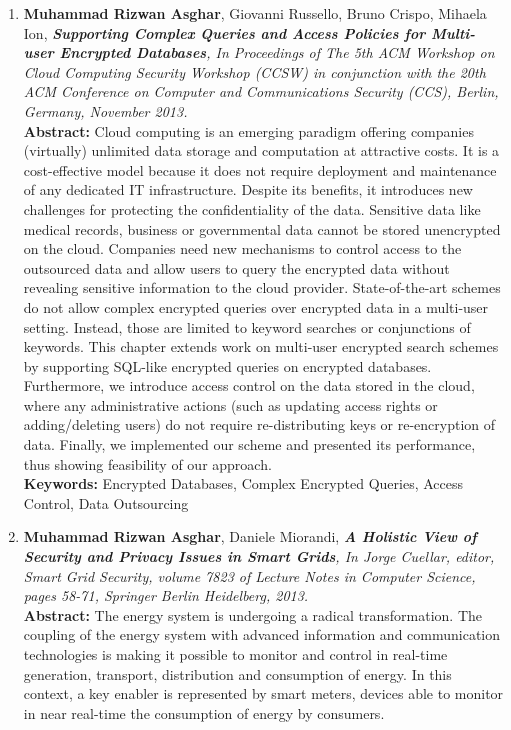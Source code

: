 \documentclass[epsfig,a4paper,11pt,titlepage]{book}
\numberwithin{algorithm}{chapter}
\begin{document}
\begin{enumerate}
  \item \textbf{Muhammad Rizwan Asghar}, Giovanni Russello, Bruno Crispo, Mihaela Ion, \textit{\textbf{Supporting Complex Queries and Access Policies for Multi-user Encrypted Databases}, In Proceedings of The 5th ACM Workshop on Cloud Computing Security Workshop (CCSW) in conjunction with the 20th ACM Conference on Computer and Communications Security (CCS), Berlin, Germany, November 2013.} \vspace{3mm} \\
\textbf{Abstract:} Cloud computing is an emerging paradigm offering companies (virtually) unlimited data storage and computation at attractive costs. It is a cost-effective model because it does not require deployment and maintenance of any dedicated \gls{IT} infrastructure. Despite its benefits, it introduces new challenges for protecting the confidentiality of the data. Sensitive data like medical records, business or governmental data cannot be stored unencrypted on the cloud. Companies need new mechanisms to control access to the outsourced data and allow users to query the encrypted data without revealing sensitive information to the cloud provider. State-of-the-art schemes do not allow complex encrypted queries over encrypted data in a multi-user setting. Instead, those are limited to keyword searches or conjunctions of keywords. This chapter extends work on multi-user encrypted search schemes by supporting SQL-like encrypted queries on encrypted databases. Furthermore, we introduce access control on the data stored in the cloud, where any administrative actions (such as updating access rights or adding/deleting users) do not require re-distributing keys or re-encryption of data. Finally, we implemented our scheme and presented its performance, thus showing feasibility of our approach. \vspace{3mm} \\
\textbf{Keywords:} Encrypted Databases, Complex Encrypted Queries, Access Control, Data Outsourcing
  
  \item \textbf{Muhammad Rizwan Asghar}, Daniele Miorandi, \textit{\textbf{A Holistic View of Security and Privacy Issues in Smart Grids}, In Jorge Cuellar, editor, Smart Grid Security, volume 7823 of Lecture Notes in Computer Science, pages 58-71, Springer Berlin Heidelberg, 2013.} \vspace{3mm} \\
\textbf{Abstract:} The energy system is undergoing a radical transformation. The coupling of the energy system with advanced information and communication technologies is making it possible to monitor and control in real-time generation, transport, distribution and consumption of energy. In this context, a key enabler is represented by smart meters, devices able to monitor in near real-time the consumption of energy by consumers. 


\end{enumerate}
\end{document}
